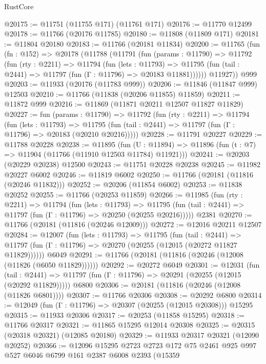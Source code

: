 \begin{lexlean}{RustCore}
\begin{coremodule}
@20175 := @11751 (@11755 @171) (@11761 @171)
@20176 := @11770 @12499
@20178 := @11766 (@20176 @11785)
@20180 := @11808 (@11809 @171)
@20181 := @11804 @20180
@20183 := @11766 (@20181 @11834)
@20200 := @11765
    (fun (fn : @152) =>
    @20178
      (@11788
        (@11791
          (fun (params : @11790) =>
          @11792
            (fun (rty : @2211) =>
            @11794
              (fun (lets : @11793) =>
              @11795 (fun (tail : @2441) => @11797 (fun (Γ : @11796) => @20183 @11881))))))
        @11927))
    @999
@20203 := @11933 (@20176 (@11783 @999))
@20206 := @11846 (@11847 @999) @12503
@20210 := @11766 (@11838 (@20206 @11855) @11859)
@20211 := @11872 @999
@20216 := @11869 (@11871 @20211 @12507 @11827 @11829)
@20227 := fun (params : @11790) =>
  @11792
    (fun (rty : @2211) =>
    @11794
      (fun (lets : @11793) =>
      @11795 (fun (tail : @2441) => @11797 (fun (Γ : @11796) => @20183 (@20210 @20216)))))
@20228 := @11791 @20227
@20229 := @11788 @20228
@20238 := @11895
    (fun (U : @11894) => @11896 (fun (t : @7) => @11904 (@11766 (@11910 @12503 @11784) @11921)))
@20241 := @20203 (@20229 @20238) @12500
@20243 := @11751 @20228 @20238
@20245 := @11982 @20227 @6002
@20246 := @11819 @6002
@20250 := @11766 (@20181 (@11816 (@20246 @11832)))
@20252 := @20206 (@11854 @6002)
@20253 := @11838 @20252
@20255 := @11766 (@20253 @11859)
@20266 := @11985
    (fun (rty : @2211) =>
    @11794
      (fun (lets : @11793) =>
      @11795 (fun (tail : @2441) => @11797 (fun (Γ : @11796) => @20250 (@20255 @20216)))))
    @2381
@20270 := @11766 (@20181 (@11816 (@20246 @12009)))
@20272 := @12016 @20211 @12507
@20284 := @12007
    (fun (lets : @11793) =>
    @11795
      (fun (tail : @2441) =>
      @11797 (fun (Γ : @11796) => @20270 (@20255 (@12015 (@20272 @11827 @11829))))))
    @6049
@20291 := @11766 (@20181 (@11816 (@20246 (@12008 (@11826 (@6050 @11829))))))
@20292 := @20272 @6049
@20301 := @12031
    (fun (tail : @2441) => @11797 (fun (Γ : @11796) => @20291 (@20255 (@12015 (@20292 @11829)))))
    @6800
@20306 := @20181 (@11816 (@20246 (@12008 (@11826 @6801))))
@20307 := @11766 @20306
@20308 := @20292 @6800
@20314 := @12049 (fun (Γ : @11796) => @20307 (@20255 (@12015 @20308))) @15295
@20315 := @11933 @20306
@20317 := @20253 (@11858 @15295)
@20318 := @11766 @20317
@20321 := @11865 @15295 @12014 @20308
@20325 := @20315 (@20318 @20321) (@12085 @20180)
@20329 := @11933 @20317 @20321 (@12090 @20252)
@20366 := @12096
    @15295
    @2723
    @2723
    @172
    @75
    @2461
    @925
    @997
    @527
    @6046
    @6799
    @161
    @2387
    @6008
    @2393
    (@15359

\end{coremodule}
\end{lexlean}

